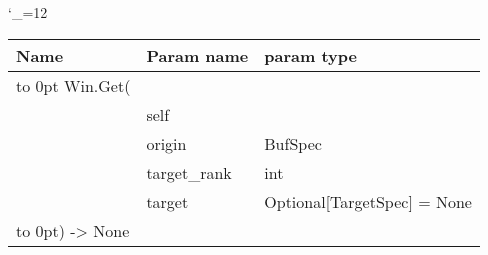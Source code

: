 \begingroup \catcode`\_=12 \tt
\begin{tabular}{lll}
\toprule
\textrm{Name}&\textrm{Param name}&\textrm{param type}\\
\midrule
\hbox to 0pt {Win.Get(\hss}\\
& self\\
& origin & BufSpec\\
& target_rank & int\\
& target & Optional[TargetSpec] = None\\
\hbox to 0pt{) -> None\hss}\\
\bottomrule
\end{tabular}
\endgroup
